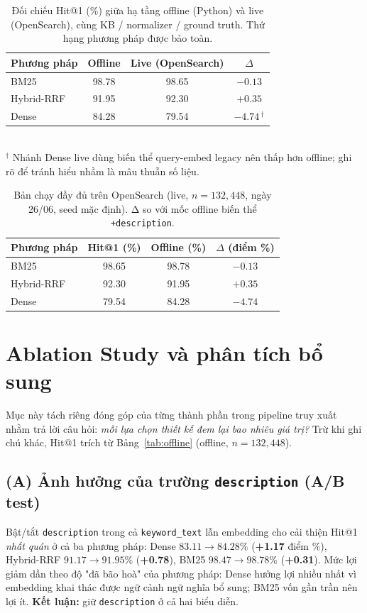 \documentclass[11pt,a4paper]{article}
\begin{document}
\begin{table}[H]
\centering
\small
\caption{Đối chiếu Hit@1 (\%) giữa hạ tầng offline (Python) và live (OpenSearch),
cùng KB / normalizer / ground truth. Thứ hạng phương pháp được bảo toàn.}
\label{tab:livevsoffline}
\begin{tabular}{lccc}
\hline
\textbf{Phương pháp} & \textbf{Offline} & \textbf{Live (OpenSearch)} &
\textbf{$\Delta$}\\
\hline
BM25        & 98.78 & 98.65 & $-0.13$\\
Hybrid-RRF  & 91.95 & 92.30 & $+0.35$\\
Dense       & 84.28 & 79.54 & $-4.74$\,$^{\dagger}$\\
\hline
\end{tabular}\\[2pt]
{\footnotesize $^{\dagger}$ Nhánh Dense live dùng biến thể query-embed legacy nên
thấp hơn offline; ghi rõ để tránh hiểu nhầm là mâu thuẫn số liệu.}
\end{table}

\begin{table}[H]
\centering
\small
\caption{Bản chạy đầy đủ trên OpenSearch (live, $n=132{,}448$, ngày 26/06,
seed mặc định). Δ so với mốc offline biến thể \texttt{+description}.}
\label{tab:livefull}
\begin{tabular}{lccc}
\hline
\textbf{Phương pháp} & \textbf{Hit@1 (\%)} & \textbf{Offline (\%)} &
\textbf{$\Delta$ (điểm \%)}\\
\hline
BM25        & 98.65 & 98.78 & $-0.13$\\
Hybrid-RRF  & 92.30 & 91.95 & $+0.35$\\
Dense       & 79.54 & 84.28 & $-4.74$\\
\hline
\end{tabular}
\end{table}

\clearpage

\section{Ablation Study và phân tích bổ sung}
\label{sec:ablation}

Mục này tách riêng đóng góp của từng thành phần trong pipeline truy xuất nhằm
trả lời câu hỏi: \emph{mỗi lựa chọn thiết kế đem lại bao nhiêu giá trị?} Trừ khi
ghi chú khác, Hit@1 trích từ Bảng~\ref{tab:offline} (offline, $n=132{,}448$).

\subsection*{(A) Ảnh hưởng của trường \texttt{description} (A/B test)}
Bật/tắt \texttt{description} trong cả \texttt{keyword\_text} lẫn embedding cho cải
thiện Hit@1 \emph{nhất quán} ở cả ba phương pháp:
Dense $83.11 \rightarrow 84.28\%$ (\textbf{+1.17} điểm \%),
Hybrid-RRF $91.17 \rightarrow 91.95\%$ (\textbf{+0.78}),
BM25 $98.47 \rightarrow 98.78\%$ (\textbf{+0.31}).
Mức lợi giảm dần theo độ "đã bão hoà" của phương pháp: Dense hưởng lợi nhiều nhất
vì embedding khai thác được ngữ cảnh ngữ nghĩa bổ sung; BM25 vốn gần trần nên lợi
ít. \textbf{Kết luận:} giữ \texttt{description} ở cả hai biểu diễn.
\end{document}
